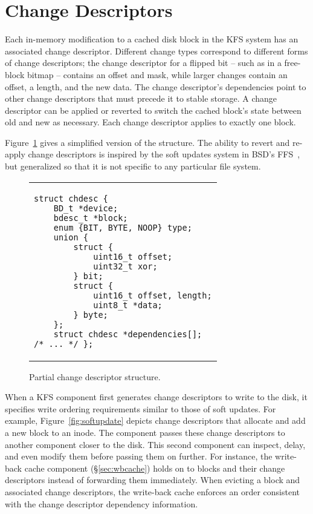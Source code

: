 \section {Change Descriptors}
\label{sec:chdescs}

Each in-memory modification to a cached disk block in the KFS system has an
associated change descriptor. Different change types correspond to different
forms of change descriptors; the change descriptor for a flipped bit -- such as
in a free-block bitmap -- contains an offset and mask, while larger changes
contain an offset, a length, and the new data. The change descriptor's
dependencies point to other change descriptors that must precede it to stable
storage. A change descriptor can be applied or reverted to switch the cached
block's state between old and new as necessary. Each change descriptor applies
to exactly one block.

Figure~\ref{fig:chdesc} gives a simplified version of the structure. The ability
to revert and re-apply change descriptors is inspired by the soft updates system
in BSD's FFS~\cite{ganger00soft}, but generalized so that it is not specific to
any particular file system.

\begin{figure}
\vskip-14pt
\begin{tabular}{@{\hskip0.58in}p{2in}@{}}
\begin{scriptsize}
\begin{verbatim}
struct chdesc {
    BD_t *device;
    bdesc_t *block;
    enum {BIT, BYTE, NOOP} type;
    union {
        struct {
            uint16_t offset;
            uint32_t xor;
        } bit;
        struct {
            uint16_t offset, length;
            uint8_t *data;
        } byte;
    };
    struct chdesc *dependencies[];
/* ... */ };
\end{verbatim}
\end{scriptsize}
\end{tabular}
\vspace{-10pt}
\caption{\label{fig:chdesc} Partial change descriptor structure.}
\end{figure}

When a KFS component first generates change descriptors to write to the disk, it
specifies write ordering requirements similar to those of soft updates. For
example, Figure~\ref{fig:softupdate} depicts change descriptors that allocate
and add a new block to an inode. The component passes these change descriptors
to another component closer to the disk. This second component can inspect,
delay, and even modify them before passing them on further. For instance, the
write-back cache component (\S\ref{sec:wbcache}) holds on to blocks and their
change descriptors instead of forwarding them immediately. When evicting a block
and associated change descriptors, the write-back cache enforces an order
consistent with the change descriptor dependency information.

